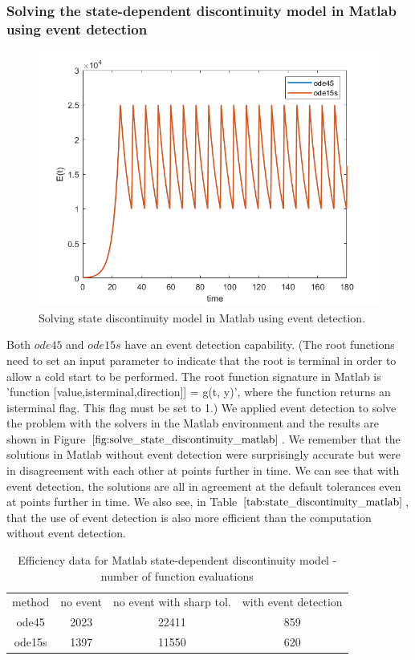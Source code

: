 \subsubsection{Solving the state-dependent discontinuity model in Matlab using event detection}
\begin{figure}[H]
\centering
\includegraphics[width=0.7\linewidth]{./figures/solve_state_discontinuity_matlab}
\caption{Solving state discontinuity model in Matlab using event detection.}
\label{fig:solve_state_discontinuity_matlab}
\end{figure}
Both $ode45$ and $ode15s$ have an event detection capability. (The root functions need to set an input parameter to indicate that the root is terminal in order to allow a cold start to be performed. The root function signature in Matlab is 'function [value,isterminal,direction]] = g(t, y)', where the function returns an isterminal flag. This flag must be set to 1.) We applied event detection to solve the problem with the solvers in the Matlab environment and the results are shown in Figure $\ref{fig:solve_state_discontinuity_matlab}$. We remember that the solutions in Matlab without event detection were surprisingly accurate but were in disagreement with each other at points further in time. We can see that with event detection, the solutions are all in agreement at the default tolerances even at points further in time. We also see, in Table $\ref{tab:state_discontinuity_matlab}$, that the use of event detection is also more efficient than the computation without event detection.

\begin{table}[h]
\caption {Efficiency data for Matlab state-dependent discontinuity model - number of function evaluations} \label{tab:state_discontinuity_matlab}
\begin{center}
\begin{tabular}{ c c c c } 
method & no event & no event with sharp tol. & with event detection \\ 
ode45 & 2023 & 22411 & 859 \\
ode15s & 1397 & 11550 & 620 \\
\end{tabular}
\end{center}
\end{table}

